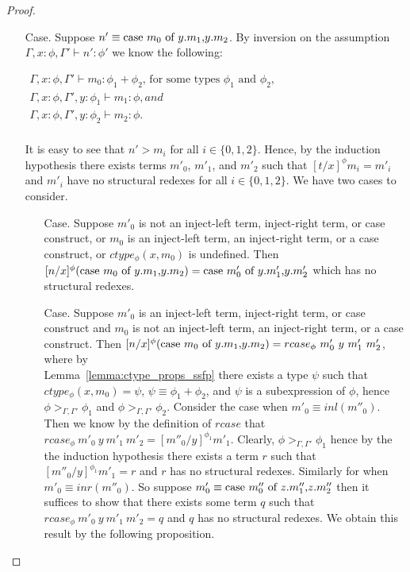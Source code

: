 \begin{proof}
\begin{itemize}
\item[Case.] Suppose $n' \equiv \mbox{case}\ m_0\ \text{of}\ y\text{.}m_1\text{,}y\text{.}m_2$. By inversion on the assumption
  $\Gamma,x:\phi,\Gamma' \vdash n':\phi'$ we know the following:
  \begin{center}
    \begin{math}
      \begin{array}{lll}
        \Gamma,x:\phi,\Gamma' \vdash m_0:\phi_1+\phi_2 \text{, for some types } \phi_1 \text{ and } \phi_2,\\
        \Gamma,x:\phi,\Gamma',y:\phi_1 \vdash m_1:\phi, and\\
        \Gamma,x:\phi,\Gamma',y:\phi_2 \vdash m_2:\phi.\\
      \end{array}
    \end{math}
  \end{center}
  It is easy to see that
  $n' > m_i$ for all $i \in \{0,1,2\}$.  Hence, by the induction hypothesis
  there exists terms $m'_0$, $m'_1$, and $m'_2$ such that $[t/x]^\phi m_i = m'_i$ and $m'_i$ have no structural redexes
  for all $i \in \{0,1,2\}$.  We have two cases to consider.
  \begin{itemize}
  \item[Case.] Suppose $m'_0$ is not an inject-left term, inject-right term, or case construct, or
    $m_0$ is an inject-left term, an inject-right term, or a case construct, or $ctype_\phi(x,m_0)$ is undefined.
    Then \\
    $[n/x]^{\phi} (\mbox{case}\ m_0\ \text{of}\ y\text{.}m_1\text{,}y\text{.}m_2) = \mbox{case}\ m'_0\ \text{of}\ y\text{.}m'_1\text{,}y\text{.}m'_2$ which has no structural redexes.
    
  \item[Case.] Suppose $m'_0$ is an inject-left term, inject-right term, or case construct and $m_0$ is not
    an inject-left term, an inject-right term, or a case construct.  Then
    $[n/x]^{\phi} (\mbox{case}\ m_0\ \text{of}\ y\text{.}m_1\text{,}y\text{.}m_2) = rcase_{\phi}\ m'_0\ y\ m'_1\ m'_2$, where by \\
    Lemma~\ref{lemma:ctype_props_ssfp}
    there exists a type $\psi$ such that $ctype_\phi(x,m_0) = \psi$, $\psi \equiv \phi_1+\phi_2$, and $\psi$ is a subexpression
    of $\phi$, hence $\phi >_{\Gamma,\Gamma'} \phi_1$ and $\phi >_{\Gamma,\Gamma'} \phi_2$.
    Consider the case when $m'_0 \equiv inl(m''_0)$.  Then we know by the definition of $rcase$ that
    $rcase_{\phi}\ m'_0\ y\ m'_1\ m'_2 = [m''_0/y]^{\phi_1} m'_1$.  Clearly, $\phi >_{\Gamma,\Gamma'} \phi_1$ hence
    by the the induction hypothesis there exists a term $r$ such that $[m''_0/y]^{\phi_1} m'_1 = r$ and
    $r$ has no structural redexes. Similarly for when $m'_0 \equiv inr(m''_0)$.  
    So suppose $m'_0 \equiv \mbox{case}\ m''_0\ \text{of}\ z\text{.}m''_1\text{,}z\text{.}m''_2$ then it suffices to show that there exists some term
    $q$ such that $rcase_{\phi}\ m'_0\ y\ m'_1\ m'_2 = q$ and $q$ has no structural redexes.  We obtain this
    result by the following proposition.
      

\end{itemize}
\end{itemize}
\end{proof}
